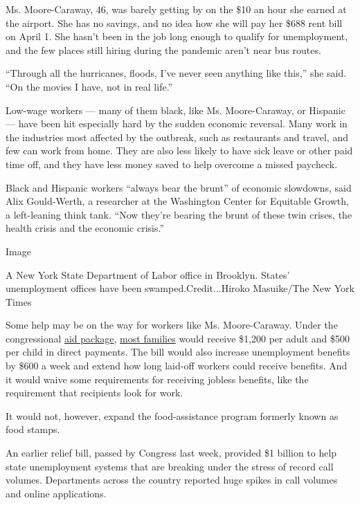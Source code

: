 Ms. Moore-Caraway, 46, was barely getting by on the \$10 an hour she
earned at the airport. She has no savings, and no idea how she will pay
her \$688 rent bill on April 1. She hasn't been in the job long enough
to qualify for unemployment, and the few places still hiring during the
pandemic aren't near bus routes.

``Through all the hurricanes, floods, I've never seen anything like
this,'' she said. ``On the movies I have, not in real life.''

Low-wage workers --- many of them black, like Ms. Moore-Caraway, or
Hispanic --- have been hit especially hard by the sudden economic
reversal. Many work in the industries most affected by the outbreak,
such as restaurants and travel, and few can work from home. They are
also less likely to have sick leave or other paid time off, and they
have less money saved to help overcome a missed paycheck.

Black and Hispanic workers ``always bear the brunt'' of economic
slowdowns, said Alix Gould-Werth, a researcher at the Washington Center
for Equitable Growth, a left-leaning think tank. ``Now they're bearing
the brunt of these twin crises, the health crisis and the economic
crisis.''

Image

A New York State Department of Labor office in Brooklyn. States'
unemployment offices have been swamped.Credit...Hiroko Masuike/The New
York Times

Some help may be on the way for workers like Ms. Moore-Caraway. Under
the congressional
\href{https://www.nytimes3xbfgragh.onion/2020/03/25/us/politics/whats-in-coronavirus-stimulus-bill.html?action=click\&module=Spotlight\&pgtype=Homepage}{aid
package},
\href{https://www.nytimes3xbfgragh.onion/article/coronavirus-stimulus-package-questions-answers.html}{most
families} would receive \$1,200 per adult and \$500 per child in direct
payments. The bill would also increase unemployment benefits by \$600 a
week and extend how long laid-off workers could receive benefits. And it
would waive some requirements for receiving jobless benefits, like the
requirement that recipients look for work.

It would not, however, expand the food-assistance program formerly known
as food stamps.

An earlier relief bill, passed by Congress last week, provided \$1
billion to help state unemployment systems that are breaking under the
stress of record call volumes. Departments across the country reported
huge spikes in call volumes and online applications.

